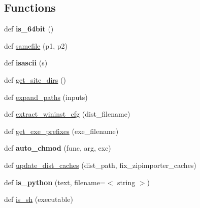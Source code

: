 \subsection*{Functions}
\begin{DoxyCompactItemize}
\item 
\mbox{\label{namespacesetuptools_1_1command_1_1easy__install_aa4ca3a8b2ff550d98b21297547692521}} 
def {\bfseries is\+\_\+64bit} ()
\item 
def \hyperlink{namespacesetuptools_1_1command_1_1easy__install_aa76ea5c13ed5487e2dbf06dae0a0f8dd}{samefile} (p1, p2)
\item 
\mbox{\label{namespacesetuptools_1_1command_1_1easy__install_a47f51f88820e98738e78ce9a3f2326c7}} 
def {\bfseries isascii} (s)
\item 
def \hyperlink{namespacesetuptools_1_1command_1_1easy__install_a2c8e8bb7ad16bf452892898a80bc9958}{get\+\_\+site\+\_\+dirs} ()
\item 
def \hyperlink{namespacesetuptools_1_1command_1_1easy__install_af321cc50ee23f37294b5fe087369316a}{expand\+\_\+paths} (inputs)
\item 
def \hyperlink{namespacesetuptools_1_1command_1_1easy__install_a8c8767cb09f060c9420cf05d0ec4eb9c}{extract\+\_\+wininst\+\_\+cfg} (dist\+\_\+filename)
\item 
def \hyperlink{namespacesetuptools_1_1command_1_1easy__install_a98b9a3d250a24f2d7332bd586fcc0d2b}{get\+\_\+exe\+\_\+prefixes} (exe\+\_\+filename)
\item 
\mbox{\label{namespacesetuptools_1_1command_1_1easy__install_a744f4ccbe5bd43d99c471ab3b9fd0809}} 
def {\bfseries auto\+\_\+chmod} (func, arg, exc)
\item 
def \hyperlink{namespacesetuptools_1_1command_1_1easy__install_ad3d06886ccd1ade947f9f6b6a3f851c0}{update\+\_\+dist\+\_\+caches} (dist\+\_\+path, fix\+\_\+zipimporter\+\_\+caches)
\item 
\mbox{\label{namespacesetuptools_1_1command_1_1easy__install_acd1aa2f7dd637039467d06ac5ce35a06}} 
def {\bfseries is\+\_\+python} (text, filename=\textquotesingle{}$<$ string $>$\textquotesingle{})
\item 
def \hyperlink{namespacesetuptools_1_1command_1_1easy__install_a8eb329bf287009f97a5804721548658d}{is\+\_\+sh} (executable)

\end{DoxyCompactItemize}
